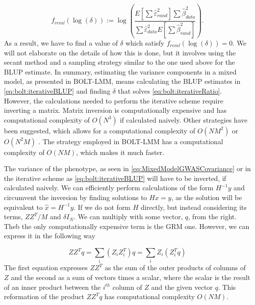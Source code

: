 \begin{equation}\label{eq:bolt:iterativeRatio}
f_{reml}(\log(\delta)) 
:= \log 
\left(
\dfrac
{
E\left[ \sum \hat{\varepsilon}^2_{rand} \right]	
\sum \hat{\beta}^2_{data}
}
{
\sum \hat{\varepsilon}^2_{data}
E\left[ \sum \hat{\beta}^2_{rand} \right]
}
\right).
\end{equation}
As a result, we have to find a value of $ \delta $ which satisfy $ f_{reml}(\log(\delta)) = 0$. We will not elaborate on the details of how this is done, but it involves using the secant method and a sampling strategy similar to the one used above for the BLUP estimate. In summary, estimating the variance components in a mixed model, as presented in BOLT-LMM, means calculating the BLUP estimates in \cref{eq:bolt:iterativeBLUP} and finding $ \delta $ that solves \cref{eq:bolt:iterativeRatio}. However, the calculations needed to perform the iterative scheme require inverting a matrix. Matrix inversion is computationally expensive and has computational complexity of $ O(N^3) $ if calculated naively. Other strategies have been suggested, which allows for a computational complexity of $ O(NM^2) $ or $ O(N^2M) $ \cite{svishcheva2012rapid,lippert2011fast}. The strategy employed in BOLT-LMM has a computational complexity of $ O(NM) $, which makes it much faster. 

The variance of the phenotype, as seen in \cref{eq:MixedModelGWASCovariance} or in the iterative scheme as \cref{eq:bolt:iterativeBLUP} will have to be inverted, if calculated naively. We can efficiently perform calculations of the form $ H^{-1}y $ and circumvent the inversion by finding solutions to $ Hx=y $, as the solution will be equivalent to $ \hat{x} =  H^{-1}y$. If we do not form $ H $ directly, but instead considering its terms, $ ZZ^T / M$ and $ \delta I_N$. We can multiply with some vector, $ q $, from the right. Theb the only computationally expensive term is the GRM one. However, we can express it in the following way

\begin{equation}
ZZ^T q = \sum_i \left( Z_i Z_i^T\right) q = \sum_i  Z_i \left(Z_i^T q\right) 
\end{equation}
The first equation expresses $ Z Z^T $ as the sum of the outer products of columns of $ Z $ and the second as a sum of vectors times a scalar, where the scalar is the result of an inner product between the $ i^{th} $ column of $ Z $ and the given vector $ q $. This reformation of the product $ Z Z^T q$ has computational complexity $ O(NM) $. 



